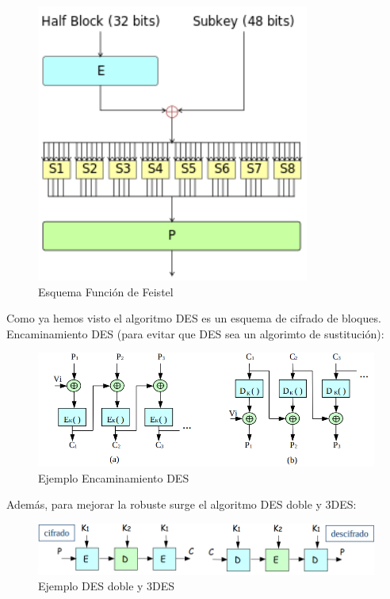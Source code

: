 \documentclass[a4paper,11pt]{article}
\begin{document}
\begin{figure}[h]
\centering
\caption{Esquema Función de Feistel}
\includegraphics[scale=1,width=0.8\textwidth]{esquema_feistel.png}
\end{figure}

Como ya hemos visto el algoritmo DES es un esquema de cifrado de bloques. Encaminamiento DES (para evitar que DES sea un algorimto de sustitución):

\begin{figure}[h]
\centering
\caption{Ejemplo Encaminamiento DES}
\includegraphics[scale=1,width=1\textwidth]{encaminamiento_des.png}
\end{figure}

Además, para mejorar la robuste surge el algoritmo DES doble y 3DES: \\

\begin{figure}[h]
\centering
\caption{Ejemplo DES doble y 3DES}
\includegraphics[scale=1,width=1\textwidth]{ejemplo_des_doble.png}
\end{figure} 
\end{document}
